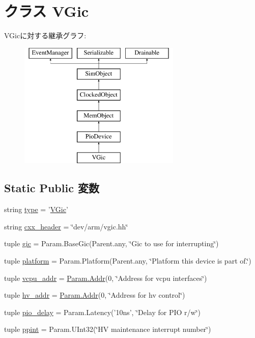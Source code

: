 \hypertarget{classRealView_1_1VGic}{
\section{クラス VGic}
\label{classRealView_1_1VGic}
}
VGicに対する継承グラフ:\begin{figure}[H]
\begin{center}
\leavevmode
\includegraphics[height=6cm]{classRealView_1_1VGic}
\end{center}
\end{figure}
\subsection*{Static Public 変数}
\begin{DoxyCompactItemize}
\item 
string \hyperlink{classRealView_1_1VGic_acce15679d830831b0bbe8ebc2a60b2ca}{type} = '\hyperlink{classRealView_1_1VGic}{VGic}'
\item 
string \hyperlink{classRealView_1_1VGic_a17da7064bc5c518791f0c891eff05fda}{cxx\_\-header} = \char`\"{}dev/arm/vgic.hh\char`\"{}
\item 
tuple \hyperlink{classRealView_1_1VGic_a40243beb62d217c3a9e35801ae739fd0}{gic} = Param.BaseGic(Parent.any, \char`\"{}Gic to use for interrupting\char`\"{})
\item 
tuple \hyperlink{classRealView_1_1VGic_ae6d09ca44893db6cdb66d62deaa1aefd}{platform} = Param.Platform(Parent.any, \char`\"{}Platform this device is part of.\char`\"{})
\item 
tuple \hyperlink{classRealView_1_1VGic_acb5766da7783d2a6344f634943031b49}{vcpu\_\-addr} = \hyperlink{base_2types_8hh_af1bb03d6a4ee096394a6749f0a169232}{Param.Addr}(0, \char`\"{}Address for vcpu interfaces\char`\"{})
\item 
tuple \hyperlink{classRealView_1_1VGic_abdd308d2d5926c04658247af1d328510}{hv\_\-addr} = \hyperlink{base_2types_8hh_af1bb03d6a4ee096394a6749f0a169232}{Param.Addr}(0, \char`\"{}Address for hv control\char`\"{})
\item 
tuple \hyperlink{classRealView_1_1VGic_a975673739b7ec6d13ec341b77941a070}{pio\_\-delay} = Param.Latency('10ns', \char`\"{}Delay for PIO r/w\char`\"{})
\item 
tuple \hyperlink{classRealView_1_1VGic_aa7766a38b2affe232e930ced4510c8b1}{ppint} = Param.UInt32(\char`\"{}HV maintenance interrupt number\char`\"{})
\end{DoxyCompactItemize}



